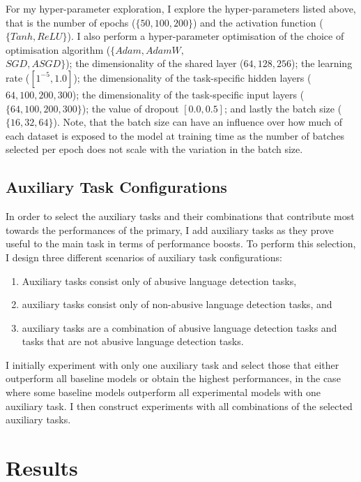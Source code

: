 For my hyper-parameter exploration, I explore the hyper-parameters listed above, that is the number of epochs ($\{50, 100, 200\}$) and the activation function ($\{Tanh, ReLU\}$).
I also perform a hyper-parameter optimisation of the choice of optimisation algorithm ($\{Adam, AdamW,$\\$SGD,ASGD\}$); the dimensionality of the shared layer (${64, 128, 256}$); the learning rate ($[1^{-5}, 1.0]$); the dimensionality of the task-specific hidden layers (${64, 100, 200, 300}$); the dimensionality of the task-specific input layers ($\{64, 100, 200, 300\}$); the value of dropout $[0.0, 0.5]$; and lastly the batch size ($\{16, 32, 64\}$).
Note, that the batch size can have an influence over how much of each dataset is exposed to the model at training time as the number of batches selected per epoch does not scale with the variation in the batch size.

\subsection{Auxiliary Task Configurations}\label{sub:aux_task_selection}
In order to select the auxiliary tasks and their combinations that contribute most towards the performances of the primary, I add auxiliary tasks as they prove useful to the main task in terms of performance boosts.
To perform this selection, I design three different scenarios of auxiliary task configurations:

\begin{enumerate}
  \item Auxiliary tasks consist only of abusive language detection tasks,
  \item auxiliary tasks consist only of non-abusive language detection tasks, and
  \item auxiliary tasks are a combination of abusive language detection tasks and tasks that are not abusive language detection tasks.
\end{enumerate}

I initially experiment with only one auxiliary task and select those that either outperform all baseline models or obtain the highest performances, in the case where some baseline models outperform all experimental models with one auxiliary task.
I then construct experiments with all combinations of the selected auxiliary tasks.

\section{Results}

